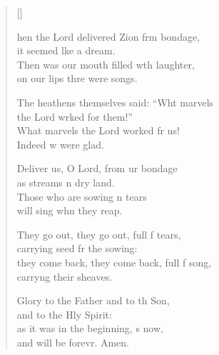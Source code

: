 \settowidth{\versewidth}{they come back, they come back, full of song, *}
\begin{verse}[\versewidth]
  \begin{patverse}
hen the Lord delivered Zion frm bondage,\Med\\
it seemed l\pointup{\i}ke a dream.\\
Then was our mouth filled w\pointup{\i}th laughter,\Med\\
on our lips thre were songs.

The heathens themselves said: “Wht marvels\Med\\
the Lord wrked for them!”\\
What marvels the Lord worked fr us!\Med\\
Indeed w were glad.

Deliver us, O Lord, from ur bondage\Med\\
as streams \pointup{\i}n dry land.\\
Those who are sowing \pointup{\i}n tears\Med\\
will sing whn they reap.

They go out, they go out, full f tears,\Med\\
carrying seed fr the sowing:\\
they come back, they come back, full f song,\Med\\
carry\pointup{\i}ng their sheaves.

Glory to the Father and to th Son,\Med\\
and to the Hly Spirit:\\
as it was in the beginning, \pointup{\i}s now,\Med\\
and will be forevr. Amen. 
  \end{patverse}
\end{verse}
